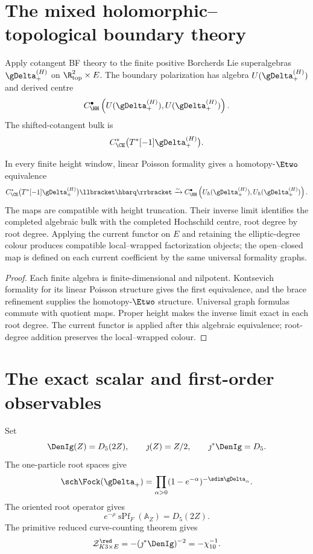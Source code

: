 \chapter{The mixed holomorphic--topological boundary theory}
Apply cotangent BF theory to the finite positive Borcherds Lie superalgebras $\gDelta_+^{(H)}$ on $\R^2_{\mathrm{top}}\times E$.  The boundary polarization has algebra $U(\gDelta_+^{(H)})$ and derived centre
\[
 C^\bullet_{\HH}
 \left(U(\gDelta_+^{(H)}),U(\gDelta_+^{(H)})\right).
\]
The shifted-cotangent bulk is
\[
 C^*_{\CE}\bigl(T^*[-1]\gDelta_+^{(H)}\bigr).
\]

\begin{theorem}
In every finite height window, linear Poisson formality gives a homotopy-$\Etwo$ equivalence
\[
 C^*_{\CE}\bigl(T^*[-1]\gDelta_+^{(H)}\bigr)\llbracket\hbarq\rrbracket
 \xrightarrow{\sim}
 C^\bullet_{\HH}
 \left(U_\hbar(\gDelta_+^{(H)}),U_\hbar(\gDelta_+^{(H)})\right).
\]
The maps are compatible with height truncation.  Their inverse limit identifies the completed algebraic bulk with the completed Hochschild centre, root degree by root degree.  Applying the current functor on $E$ and retaining the elliptic-degree colour produces compatible local--wrapped factorization objects; the open--closed map is defined on each current coefficient by the same universal formality graphs.
\end{theorem}
\begin{proof}
Each finite algebra is finite-dimensional and nilpotent.  Kontsevich formality for its linear Poisson structure gives the first equivalence, and the brace refinement supplies the homotopy-$\Etwo$ structure.  Universal graph formulas commute with quotient maps.  Proper height makes the inverse limit exact in each root degree.  The current functor is applied after this algebraic equivalence; root-degree addition preserves the local--wrapped colour.
\end{proof}

\chapter{The exact scalar and first-order observables}
Set
\[
 \DenIg(Z)=D_5(2Z),
 \qquad \jmath(Z)=Z/2,
 \qquad \jmath^*\DenIg=D_5.
\]
The one-particle root spaces give
\[
 \sch\Fock(\gDelta_+)
 =\prod_{\alpha>0}(1-e^{-\alpha})^{-\sdim\gDelta_\alpha}.
\]
The oriented root operator gives
\[
 e^{-\rho}\operatorname{sPf}_F(\mathbb A_Z)=D_5(2Z).
\]
The primitive reduced curve-counting theorem gives
\[
 \mathcal Z^{\red}_{K3\times E}=-(\jmath^*\DenIg)^{-2}=-\chi_{10}^{-1}.
\]

